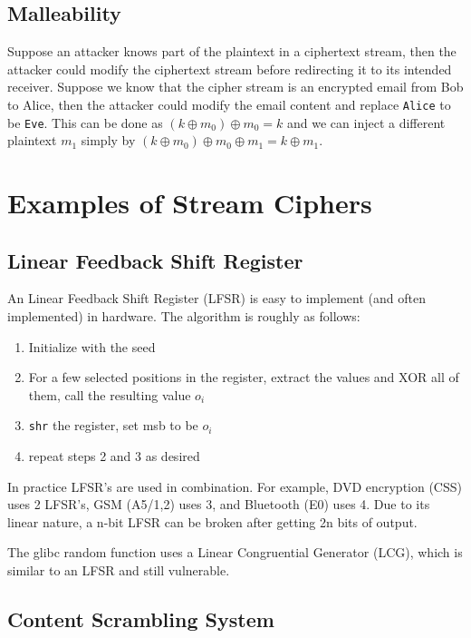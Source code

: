 \documentclass{article}
\begin{document}
\begin{multicols}{2}
\subsection{Malleability}

Suppose an attacker knows part of the plaintext in a ciphertext stream, then the attacker could modify the ciphertext stream before redirecting it to its intended receiver. Suppose we know that the cipher stream is an encrypted email from Bob to Alice, then the attacker could modify the email content and replace \texttt{Alice} to be \texttt{Eve}. This can be done as $(k \oplus m_0 ) \oplus m_0 = k$ and we can inject a different plaintext $m_1$ simply by $(k \oplus m_0 ) \oplus m_0 \oplus m_1 = k \oplus m_1$.

\section{Examples of Stream Ciphers}
\subsection{Linear Feedback Shift Register}

An Linear Feedback Shift Register (LFSR) is easy to implement (and often implemented) in hardware. The algorithm is roughly as follows:

\begin{enumerate}
    \item Initialize with the seed
    \item For a few selected positions in the register, extract the values and XOR all of them, call the resulting value $o_i$
    \item \texttt{shr} the register, set msb to be $o_i$
    \item repeat steps 2 and 3 as desired
\end{enumerate}

In practice LFSR's are used in combination. For example, DVD encryption (CSS) uses 2 LFSR's, GSM (A5/1,2) uses 3, and Bluetooth (E0) uses 4. Due to its linear nature, a n-bit LFSR can be broken after getting 2n bits of output. 

The glibc random function uses a Linear Congruential Generator (LCG), which is similar to an LFSR and still vulnerable.

\subsection{Content Scrambling System}


\end{multicols}
\end{document}
